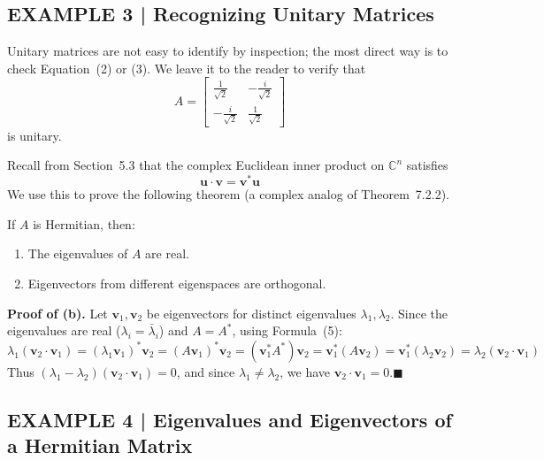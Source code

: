 \documentclass{article}
\begin{document}
\subsection*{EXAMPLE 3 | Recognizing Unitary Matrices}

Unitary matrices are not easy to identify by inspection; the most direct way is to check
Equation~(2) or (3). We leave it to the reader to verify that
\[
  A = \begin{bmatrix} \tfrac{1}{\sqrt{2}} & -\tfrac{i}{\sqrt{2}} \\ -\tfrac{i}{\sqrt{2}} & \tfrac{1}{\sqrt{2}} \end{bmatrix}
\]
is unitary.

Recall from Section~5.3 that the complex Euclidean inner product on $\mathbb{C}^n$ satisfies
\begin{equation}
  \mathbf{u}\cdot\mathbf{v} = \mathbf{v}^*\mathbf{u}
\end{equation}
We use this to prove the following theorem (a complex analog of Theorem~7.2.2).

\begin{tcolorbox}[colback=red!4, colframe=red!60!black,
  title={\textbf{Theorem 7.5.2}}, boxrule=0.5mm, arc=3mm]
If $A$ is Hermitian, then:
\begin{enumerate}
  \item[(a)] The eigenvalues of $A$ are real.
  \item[(b)] Eigenvectors from different eigenspaces are orthogonal.
\end{enumerate}

\medskip
\textbf{Proof of (b).} Let $\mathbf{v}_1,\mathbf{v}_2$ be eigenvectors for distinct eigenvalues
$\lambda_1,\lambda_2$. Since the eigenvalues are real ($\lambda_i = \bar{\lambda}_i$) and $A = A^*$,
using Formula~(5):
\[
  \lambda_1(\mathbf{v}_2\cdot\mathbf{v}_1)
  = (\lambda_1\mathbf{v}_1)^*\mathbf{v}_2
  = (A\mathbf{v}_1)^*\mathbf{v}_2
  = (\mathbf{v}_1^*A^*)\mathbf{v}_2
  = \mathbf{v}_1^*(A\mathbf{v}_2)
  = \mathbf{v}_1^*(\lambda_2\mathbf{v}_2)
  = \lambda_2(\mathbf{v}_2\cdot\mathbf{v}_1)
\]
Thus $(\lambda_1-\lambda_2)(\mathbf{v}_2\cdot\mathbf{v}_1)=0$, and since $\lambda_1\neq\lambda_2$,
we have $\mathbf{v}_2\cdot\mathbf{v}_1 = 0$.\quad$\blacksquare$
\end{tcolorbox}

\subsection*{EXAMPLE 4 | Eigenvalues and Eigenvectors of a Hermitian Matrix}
\end{document}
